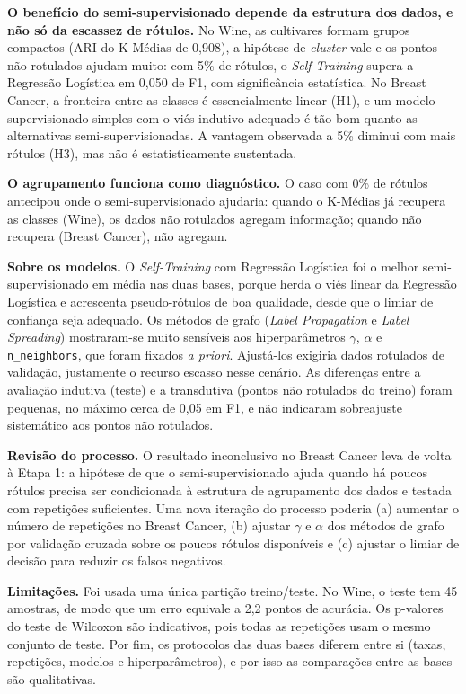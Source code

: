 \textbf{O benefício do semi-supervisionado depende da estrutura dos dados, e não só da escassez de rótulos.} No Wine, as cultivares formam grupos compactos (ARI do K-Médias de 0,908), a hipótese de \textit{cluster} vale e os pontos não rotulados ajudam muito: com 5\% de rótulos, o \textit{Self-Training} supera a Regressão Logística em 0,050 de F1, com significância estatística. No Breast Cancer, a fronteira entre as classes é essencialmente linear (H1), e um modelo supervisionado simples com o viés indutivo adequado é tão bom quanto as alternativas semi-supervisionadas. A vantagem observada a 5\% diminui com mais rótulos (H3), mas não é estatisticamente sustentada.

\textbf{O agrupamento funciona como diagnóstico.} O caso com 0\% de rótulos antecipou onde o semi-supervisionado ajudaria: quando o K-Médias já recupera as classes (Wine), os dados não rotulados agregam informação; quando não recupera (Breast Cancer), não agregam.

\textbf{Sobre os modelos.} O \textit{Self-Training} com Regressão Logística foi o melhor semi-supervisionado em média nas duas bases, porque herda o viés linear da Regressão Logística e acrescenta pseudo-rótulos de boa qualidade, desde que o limiar de confiança seja adequado. Os métodos de grafo (\textit{Label Propagation} e \textit{Label Spreading}) mostraram-se muito sensíveis aos hiperparâmetros $\gamma$, $\alpha$ e \texttt{n\_neighbors}, que foram fixados \textit{a priori}. Ajustá-los exigiria dados rotulados de validação, justamente o recurso escasso nesse cenário. As diferenças entre a avaliação indutiva (teste) e a transdutiva (pontos não rotulados do treino) foram pequenas, no máximo cerca de 0,05 em F1, e não indicaram sobreajuste sistemático aos pontos não rotulados.

\textbf{Revisão do processo.} O resultado inconclusivo no Breast Cancer leva de volta à Etapa 1: a hipótese de que o semi-supervisionado ajuda quando há poucos rótulos precisa ser condicionada à estrutura de agrupamento dos dados e testada com repetições suficientes. Uma nova iteração do processo poderia (a) aumentar o número de repetições no Breast Cancer, (b) ajustar $\gamma$ e $\alpha$ dos métodos de grafo por validação cruzada sobre os poucos rótulos disponíveis e (c) ajustar o limiar de decisão para reduzir os falsos negativos.

\textbf{Limitações.} Foi usada uma única partição treino/teste. No Wine, o teste tem 45 amostras, de modo que um erro equivale a 2,2 pontos de acurácia. Os p-valores do teste de Wilcoxon são indicativos, pois todas as repetições usam o mesmo conjunto de teste. Por fim, os protocolos das duas bases diferem entre si (taxas, repetições, modelos e hiperparâmetros), e por isso as comparações entre as bases são qualitativas.

